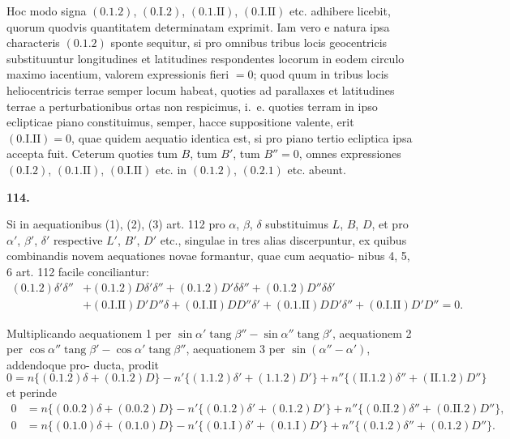 \documentclass[12pt,a4paper]{article}
\DeclareMathOperator{\tang}{tang}
\begin{document}
Hoc modo signa $(0.1.2)$, $(0.\text{I}.2)$, $(0.1.\text{II})$, $(0.\text{I}.\text{II})$ etc. adhibere licebit,
quorum quodvis quantitatem determinatam exprimit. Iam vero e natura ipsa
characteris $(0.1.2)$ sponte sequitur, si pro omnibus tribus locis geocentricis
substituuntur longitudines et latitudines respondentes locorum in eodem circulo
maximo iacentium, valorem expressionis fieri $= 0$; quod quum in tribus locis
heliocentricis terrae semper locum habeat, quoties ad parallaxes et latitudines
terrae a perturbationibus ortas non respicimus, i.~e. quoties terram in ipso
eclipticae piano constituimus, semper, hacce suppositione valente, erit
$(0.\text{I}.\text{II}) = 0$, quae quidem aequatio identica est, si pro piano tertio ecliptica
ipsa accepta fuit. Ceterum quoties tum $B$, tum $B'$, tum $B'' = 0$, omnes
expressiones $(0.\text{I}.2)$, $(0.1.\text{II})$, $(0.\text{I}.\text{II})$ etc. in $(0.1.2)$, $(0.2.1)$ etc.
abeunt.

\bigskip
\noindent\textbf{114.}

Si in aequationibus (1), (2), (3) art. 112 pro $\alpha$, $\beta$, $\delta$ substituimus $L$, $B$, $D$,
et pro $\alpha'$, $\beta'$, $\delta'$ respective $L'$, $B'$, $D'$ etc., singulae in tres alias discerpuntur,
ex quibus combinandis novem aequationes novae formantur, quae cum aequatio-
nibus 4, 5, 6 art. 112 facile conciliantur:
\begin{align*}
(0.1.2)\delta'\delta'' &+ (0.1.2)D\delta'\delta'' + (0.1.2)D'\delta\delta'' + (0.1.2)D''\delta\delta' \\
&+ (0.\text{I}.\text{II})D'D''\delta + (0.\text{I}.\text{II})DD''\delta' + (0.1.\text{II})DD'\delta'' + (0.\text{I}.\text{II})D'D'' = 0.
\end{align*}

Multiplicando aequationem 1 per $\sin\alpha'\tang\beta'' - \sin\alpha''\tang\beta'$,
aequationem 2 per $\cos\alpha''\tang\beta' - \cos\alpha'\tang\beta''$, aequationem 3 per
$\sin(\alpha'' - \alpha')$, addendoque pro-
ducta, prodit
\begin{equation}
0 = n\{(0.1.2)\delta + (0.1.2)D\} - n'\{(1.1.2)\delta' + (1.1.2)D'\} + n''\{(\text{II}.1.2)\delta'' + (\text{II}.1.2)D''\} \tag{9}
\end{equation}
et perinde
\begin{align}
0 &= n\{(0.0.2)\delta + (0.0.2)D\} - n'\{(0.1.2)\delta' + (0.1.2)D'\} + n''\{(0.\text{II}.2)\delta'' + (0.\text{II}.2)D''\}, \tag{10} \\
0 &= n\{(0.1.0)\delta + (0.1.0)D\} - n'\{(0.1.\text{I})\delta' + (0.1.\text{I})D'\} + n''\{(0.1.2)\delta'' + (0.1.2)D''\}. \tag{11}
\end{align}
\end{document}
